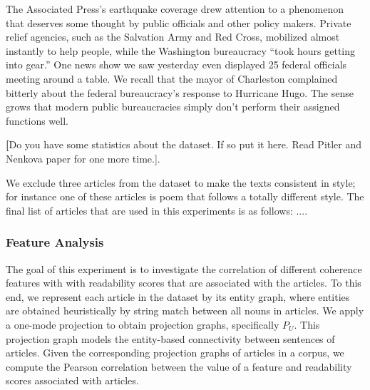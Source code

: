 \begin{examples}
	\label{ex:wsj-1818}
	The Associated Press's earthquake coverage drew attention to a phenomenon that deserves some thought by public officials and other policy makers. 
	Private relief agencies, such as the Salvation Army and Red Cross, mobilized almost instantly to help people, while the Washington bureaucracy ``took hours getting into gear.'' 
	One news show we saw yesterday even displayed 25 federal officials meeting around a table. 
	We recall that the mayor of Charleston complained bitterly about the federal bureaucracy's response to Hurricane Hugo. 
	The sense grows that modern public bureaucracies simply don't perform their assigned functions well. 
\end{examples}

\textbf[Do you have some statistics about the dataset. If so put it here. Read Pitler and Nenkova paper for one more time.].

We exclude three articles from the dataset to make the texts consistent in style; for instance one of these articles is poem that follows a totally different style. 
The final list of articles that are used in this experiments is as follows:
....

\subsubsection{Feature Analysis}

The goal of this experiment is to investigate the correlation of different coherence features with with readability scores that are associated  with the articles. 
To this end, we represent each article in the dataset by its entity graph, where entities are obtained heuristically by string match between all nouns in articles. 
We apply a one-mode projection to obtain projection graphs, specifically $P_U$. 
This projection graph models the entity-based connectivity between sentences of articles. 
Given the corresponding projection graphs of articles in a corpus, we compute the Pearson correlation between the value of a feature and readability scores associated with articles. 

